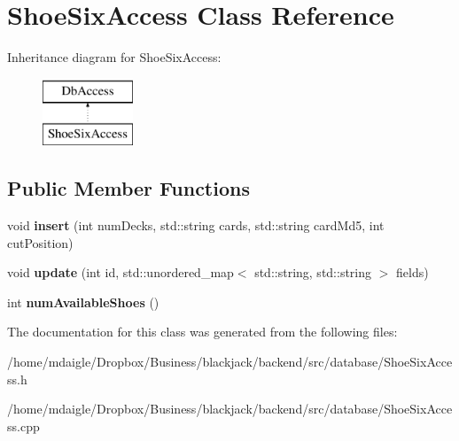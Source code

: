 \hypertarget{classShoeSixAccess}{
\section{\-Shoe\-Six\-Access \-Class \-Reference}
\label{db/db2/classShoeSixAccess}
}
\-Inheritance diagram for \-Shoe\-Six\-Access\-:\begin{figure}[H]
\begin{center}
\leavevmode
\includegraphics[height=2.000000cm]{db/db2/classShoeSixAccess}
\end{center}
\end{figure}
\subsection*{\-Public \-Member \-Functions}
\begin{DoxyCompactItemize}
\item 
\hypertarget{classShoeSixAccess_a54c79af33ba1cc82fd8ce2159b1960dc}{
void {\bfseries insert} (int num\-Decks, std\-::string cards, std\-::string card\-Md5, int cut\-Position)}
\label{db/db2/classShoeSixAccess_a54c79af33ba1cc82fd8ce2159b1960dc}

\item 
\hypertarget{classShoeSixAccess_a0693a2f5f2f5bc3426b72d4d9bb25078}{
void {\bfseries update} (int id, std\-::unordered\-\_\-map$<$ std\-::string, std\-::string $>$ fields)}
\label{db/db2/classShoeSixAccess_a0693a2f5f2f5bc3426b72d4d9bb25078}

\item 
\hypertarget{classShoeSixAccess_a3388fffe03dcf6f6f17f2ebd5cbd515a}{
int {\bfseries num\-Available\-Shoes} ()}
\label{db/db2/classShoeSixAccess_a3388fffe03dcf6f6f17f2ebd5cbd515a}

\end{DoxyCompactItemize}


\-The documentation for this class was generated from the following files\-:\begin{DoxyCompactItemize}
\item 
/home/mdaigle/\-Dropbox/\-Business/blackjack/backend/src/database/\-Shoe\-Six\-Access.\-h\item 
/home/mdaigle/\-Dropbox/\-Business/blackjack/backend/src/database/\-Shoe\-Six\-Access.\-cpp\end{DoxyCompactItemize}
